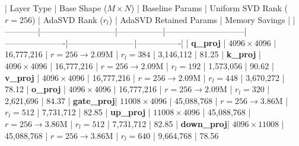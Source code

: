 | Layer Type | Base Shape ($M \times N$) | Baseline Params | Uniform SVD Rank ($r=256$) | AdaSVD Rank ($r_l$) | AdaSVD Retained Params | Memory Savings |
|------------|---------------------------|-----------------|-----------------------------|----------------------|------------------------|----------------|
| \textbf{q_proj}  | $4096 \times 4096$        | 16,777,216      | $r=256 \to 2.09\text{M}$    | $r_l=384$            | 3,146,112              | 81.25%
| \textbf{k_proj}  | $4096 \times 4096$        | 16,777,216      | $r=256 \to 2.09\text{M}$    | $r_l=192$            | 1,573,056              | 90.62%
| \textbf{v_proj}  | $4096 \times 4096$        | 16,777,216      | $r=256 \to 2.09\text{M}$    | $r_l=448$            | 3,670,272              | 78.12%
| \textbf{o_proj}  | $4096 \times 4096$        | 16,777,216      | $r=256 \to 2.09\text{M}$    | $r_l=320$            | 2,621,696              | 84.37%
| \textbf{gate_proj}| $11008 \times 4096$       | 45,088,768      | $r=256 \to 3.86\text{M}$    | $r_l=512$            | 7,731,712              | 82.85%
| \textbf{up_proj} | $11008 \times 4096$       | 45,088,768      | $r=256 \to 3.86\text{M}$    | $r_l=512$            | 7,731,712              | 82.85%
| \textbf{down_proj}| $4096 \times 11008$       | 45,088,768      | $r=256 \to 3.86\text{M}$    | $r_l=640$            | 9,664,768              | 78.56%
